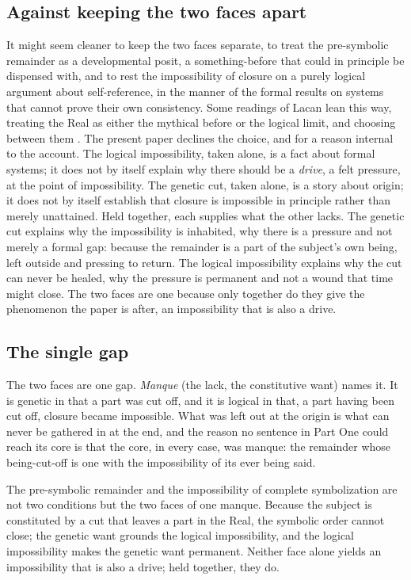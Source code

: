 \subsection*{Against keeping the two faces apart}

It might seem cleaner to keep the two faces separate, to treat the pre-symbolic remainder as a developmental posit, a something-before that could in principle be dispensed with, and to rest the impossibility of closure on a purely logical argument about self-reference, in the manner of the formal results on systems that cannot prove their own consistency. Some readings of Lacan lean this way, treating the Real as either the mythical before or the logical limit, and choosing between them \parencite{copjec1994read,chiesa2007subjectivity}. The present paper declines the choice, and for a reason internal to the account. The logical impossibility, taken alone, is a fact about formal systems; it does not by itself explain why there should be a \emph{drive}, a felt pressure, at the point of impossibility. The genetic cut, taken alone, is a story about origin; it does not by itself establish that closure is impossible in principle rather than merely unattained. Held together, each supplies what the other lacks. The genetic cut explains why the impossibility is inhabited, why there is a pressure and not merely a formal gap: because the remainder is a part of the subject's own being, left outside and pressing to return. The logical impossibility explains why the cut can never be healed, why the pressure is permanent and not a wound that time might close. The two faces are one because only together do they give the phenomenon the paper is after, an impossibility that is also a drive.

\subsection*{The single gap}

The two faces are one gap. \emph{Manque} (the lack, the constitutive want) names it. It is genetic in that a part was cut off, and it is logical in that, a part having been cut off, closure became impossible. What was left out at the origin is what can never be gathered in at the end, and the reason no sentence in Part One could reach its core is that the core, in every case, was manque: the remainder whose being-cut-off is one with the impossibility of its ever being said.

\begin{claim}
The pre-symbolic remainder and the impossibility of complete symbolization are not two conditions but the two faces of one manque. Because the subject is constituted by a cut that leaves a part in the Real, the symbolic order cannot close; the genetic want grounds the logical impossibility, and the logical impossibility makes the genetic want permanent. Neither face alone yields an impossibility that is also a drive; held together, they do.
\end{claim}
